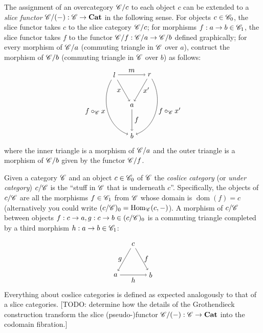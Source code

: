 \documentclass[12pt]{article}
\theoremstyle{definition}
\theoremstyle{remark}
\DeclareMathOperator{\Hom}{Hom}
\DeclareMathOperator{\dom}{dom}
\begin{document}
The assignment of an overcategory $\mathscr{C}/c$ to each object $c$ can be extended to a \textit{slice functor} $\mathscr{C} / (-) : \mathscr{C} \to \mathbf{Cat}$ in the following sense. For objects $c \in \mathscr{C}_0$, the slice functor takes $c$ to the slice category $\mathscr{C}/c$; for morphisms $f : a \to b \in \mathscr{C}_1$, the slice functor takes $f$ to the functor $\mathscr{C} / f : \mathscr{C} / a \to \mathscr{C} / b$ defined graphically; for every morphism of $\mathscr{C} / a$ (commuting triangle in $\mathscr{C}$ over $a$), contruct the morphism of $\mathscr{C} / b$ (commuting triangle in $\mathscr{C}$ over $b$) as follows:
\[
    \begin{tikzpicture}
            \draw (150:1) node(tl){$l$};
            \draw ( 30:1) node(tr){$r$};
            \draw (270:1) node(bm){$a$};
            \draw (270:2.5) node(bb){$b$};

            \draw[->] (tl) to node[below,left ]{$x$}  (bm);
            \draw[->] (tr) to node[below,right]{$x'$} (bm);
            \draw[->] (tl) to[out=-120, in=+160] node[below,left ]{$f \circ_{\catC} x$}  (bb);
            \draw[->] (tr) to[out= -60, in= +20] node[below,right]{$f \circ_{\catC} x'$} (bb);
            \draw[->] (tl) to node[above]{$m$} (tr);
            \draw[->] (bm) to node[right]{$f$} (bb);
    \end{tikzpicture}
\]
where the inner triangle is a morphism of $\mathscr{C}/a$ and the outer triangle is a morphism of $\mathscr{C}/b$ given by the functor $\mathscr{C}/f$.

Given a category $\mathscr{C}$ and an object $c \in \mathscr{C}_0$ of $\mathscr{C}$ the \textit{coslice category} (or \textit{under category}) $c/\mathscr{C}$ is the ``stuff in $\mathscr{C}$ that is underneath $c$''. Specifically, the objects of $c/\mathscr{C}$ are all the morphisms $f \in \mathscr{C}_1$ from $\mathscr{C}$ whose domain is $\dom(f) = c$ (alternatively you could write $(c/\catC)_0 = \Hom_{\catC}(c,-)$). A morphism of $c/\mathscr{C}$ between objects $f : c \to a, g : c \to b \in (c/\mathscr{C})_0$ is a commuting triangle completed by a third morphism $h : a \to b \in \mathscr{C}_1$:

\[
    \begin{tikzpicture}
        \draw (210:1) node(tl){$a$};
        \draw (330:1) node(tr){$b$};
        \draw ( 90:1) node(bm){$c$};

        \draw[<-] (tl) to node[below,left ]{$g$} (bm);
        \draw[<-] (tr) to node[below,right]{$f$} (bm);
        \draw[->] (tl) to node[below]{$h$} (tr);
    \end{tikzpicture}
\]
Everything about coslice categories is defined as expected analogously to that of a slice categories.
\textcolor{red!50!black}{[TODO: determine how the details of the Grothendieck construction transform the slice (pseudo-)functor $\mathscr{C} / (-) : \mathscr{C} \to \mathbf{Cat}$ into the codomain fibration.]}
\end{document}
